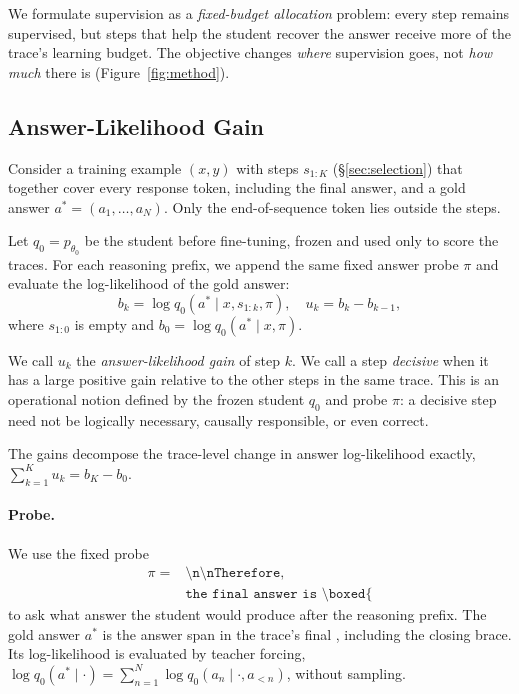 
We formulate supervision as a \emph{fixed-budget allocation} problem: every step remains supervised, but steps that help the student recover the answer receive more of the trace's learning budget. The objective changes \emph{where} supervision goes, not \emph{how much} there is (Figure~\ref{fig:method}).

\subsection{Answer-Likelihood Gain}
\label{sec:gain}
Consider a training example $(x,y)$ with steps $s_{1:K}$ (\S\ref{sec:selection}) that together cover every response token, including the final answer, and a gold answer $a^*=(a_1,\ldots,a_N)$. Only the end-of-sequence token lies outside the steps.

Let $q_0=p_{\theta_0}$ be the student before fine-tuning, frozen and used only to score the traces. For each reasoning prefix, we append the same fixed answer probe $\pi$ and evaluate the log-likelihood of the gold answer:
\begin{equation}
b_k = \log q_0(a^*\mid x,s_{1:k},\pi),
\quad
u_k = b_k-b_{k-1},
\label{eq:gain}
\end{equation}
where $s_{1:0}$ is empty and $b_0=\log q_0(a^*\mid x,\pi)$.

We call $u_k$ the \emph{answer-likelihood gain} of step $k$. We call a step \emph{decisive} when it has a large positive gain relative to the other steps in the same trace. This is an operational notion defined by the frozen student $q_0$ and probe $\pi$: a decisive step need not be logically necessary, causally responsible, or even correct.

The gains decompose the trace-level change in answer log-likelihood exactly, $\sum_{k=1}^{K}u_k=b_K-b_0$.

\paragraph{Probe.}
We use the fixed probe 
\[
\begin{aligned}
\pi ={} & \texttt{\textbackslash n\textbackslash nTherefore, } \\
        & \texttt{the final answer is \textbackslash boxed\{}
\end{aligned}
\]
to ask what answer the student would produce after the reasoning prefix. The gold answer $a^*$ is the answer span in the trace's final \boxedtok{}, including the closing brace. Its log-likelihood is evaluated by teacher forcing, $\log q_0(a^*\mid\cdot) = \sum_{n=1}^{N} \log q_0(a_n\mid\cdot,a_{<n})$, without sampling.

